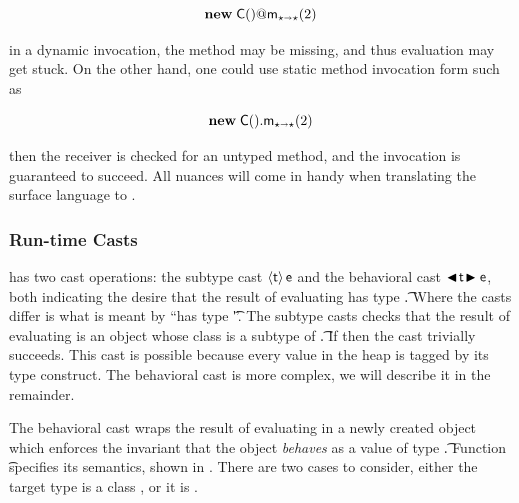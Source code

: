 \documentclass[USenglish]{tex/lipics-v2016}
\begin{document}
\vspace{-6mm}\[\DynCall{\New\C{}}\m{2}\]\vspace{-5mm}

\noindent in a dynamic invocation, the method may be missing, and thus
evaluation may get stuck. On the other hand, one could use  static
method invocation form such as

\vspace{-6mm}\[\KCall{\New\C{}}\m{2}\any\any\]\vspace{-5mm}

\noindent then the receiver is checked for an untyped method, and the
invocation is guaranteed to succeed. All nuances will come in handy when
translating the surface language to \kafka.

\subsubsection{Run-time Casts}

\kafka has two cast operations: the subtype cast $\SubCast\t\e$ and the
behavioral cast $\BehCast\t\e$, both indicating the desire that the result
of evaluating \e has type \t.  Where the casts differ is what is meant by
``has type \t''.  The subtype casts checks that the result of evaluating \e
is an object whose class is a subtype of \t. If \EM{\t=\any} then the cast
trivially succeeds. This cast is possible because every value in the heap is
tagged by its type construct. The behavioral cast is more complex, we will
describe it in the remainder.

The behavioral cast wraps the result of evaluating \e in a newly created
object which enforces the invariant that the object \emph{behaves} as a
value of type \t.  Function \behcastE\a\t\s\K \Kp\ap\sp specifies its
semantics, shown in .  There are two cases to consider,
either the target type is a class \Cp, or it is \any.
\end{document}
